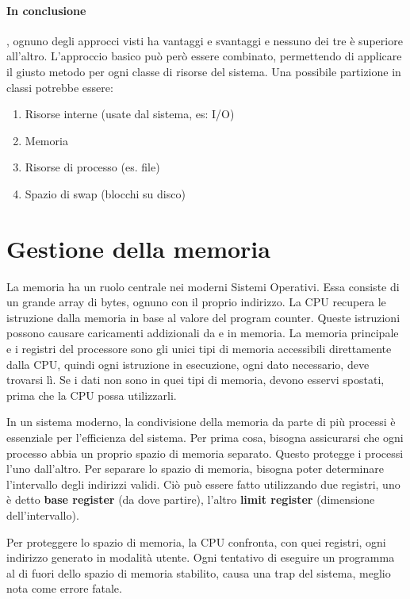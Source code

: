 \documentclass[a4paper]{article}
\begin{document}
\paragraph{In conclusione}, ognuno degli approcci visti ha vantaggi e svantaggi e nessuno dei tre è superiore all'altro. L'approccio basico può però essere combinato, permettendo di applicare il giusto metodo per ogni classe di risorse del sistema. Una possibile partizione in classi potrebbe essere:
\begin{enumerate}
   \item Risorse interne (usate dal sistema, es: I/O)
   \item Memoria
   \item Risorse di processo (es. file)
   \item Spazio di swap (blocchi su disco)
\end{enumerate}

\newpage
\section{Gestione della memoria}
La memoria ha un ruolo centrale nei moderni Sistemi Operativi. Essa consiste di un grande array di bytes, ognuno con il proprio indirizzo. La CPU recupera le istruzione dalla memoria in base al valore del program counter. Queste istruzioni possono causare caricamenti addizionali da e in memoria. La memoria principale e i registri del processore sono gli unici tipi di memoria accessibili direttamente dalla CPU, quindi ogni istruzione in esecuzione, ogni dato necessario, deve trovarsi lì. Se i dati non sono in quei tipi di memoria, devono esservi spostati, prima che la CPU possa utilizzarli.

In un sistema moderno, la condivisione della memoria da parte di più processi è essenziale per l'efficienza del sistema. Per prima cosa, bisogna assicurarsi che ogni processo abbia un proprio spazio di memoria separato. Questo protegge i processi l'uno dall'altro. Per separare lo spazio di memoria, bisogna poter determinare l'intervallo degli indirizzi validi. Ciò può essere fatto utilizzando due registri, uno è detto \textbf{base register} (da dove partire), l'altro \textbf{limit register} (dimensione dell'intervallo).

Per proteggere lo spazio di memoria, la CPU confronta, con quei registri, ogni indirizzo generato in modalità utente. Ogni tentativo di eseguire un programma al di fuori dello spazio di memoria stabilito, causa una trap del sistema, meglio nota come errore fatale.
\end{document}
